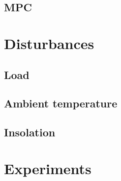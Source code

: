 

\subsection{MPC}



\section{Disturbances}

\subsection{Load}



\subsection{Ambient temperature}



\subsection{Insolation}



\section{Experiments}
